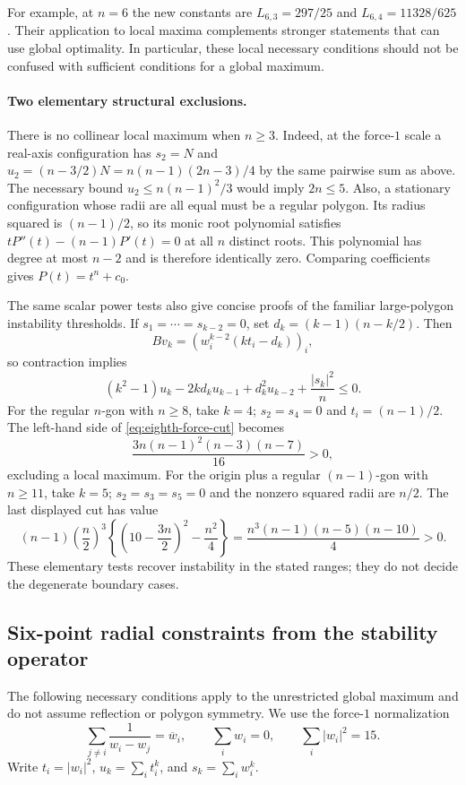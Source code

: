 \documentclass[11pt]{article}
\theoremstyle{remark}
\numberwithin{equation}{section}
\begin{document}
For example, at $n=6$ the new constants are
$L_{6,3}=297/25$ and $L_{6,4}=11328/625$.
Their application to local maxima complements stronger statements
that can use global optimality.  In particular, these local
necessary conditions should not be confused with sufficient
conditions for a global maximum.

\paragraph{Two elementary structural exclusions.}
There is no collinear local maximum when $n\ge3$.
Indeed, at the force-$1$ scale a real-axis configuration has
$s_2=N$ and
$u_2=(n-3/2)N=n(n-1)(2n-3)/4$ by the same pairwise sum as above.
The necessary bound $u_2\le n(n-1)^2/3$ would imply $2n\le5$.
Also, a stationary configuration whose radii are all equal must
be a regular polygon.  Its radius squared is $(n-1)/2$, so its
monic root polynomial satisfies
$tP''(t)-(n-1)P'(t)=0$ at all $n$ distinct roots.  This polynomial
has degree at most $n-2$ and is therefore identically zero.
Comparing coefficients gives $P(t)=t^n+c_0$.

The same scalar power tests also give concise proofs of the familiar
large-polygon instability thresholds.  If
$s_1=\cdots=s_{k-2}=0$, set
$d_k=(k-1)(n-k/2)$.  Then
\[
 Bv_k=(w_i^{k-2}(kt_i-d_k))_i,
\]
so contraction implies
\[
 (k^2-1)u_k-2kd_ku_{k-1}+d_k^2u_{k-2}
       +\frac{|s_k|^2}{n}\le0.
\]
For the regular $n$-gon with $n\ge8$, take $k=4$;
$s_2=s_4=0$ and $t_i=(n-1)/2$.  The left-hand side of
\eqref{eq:eighth-force-cut} becomes
\[
 \frac{3n(n-1)^2(n-3)(n-7)}{16}>0,
\]
excluding a local maximum.  For the origin plus a regular
$(n-1)$-gon with $n\ge11$, take $k=5$;
$s_2=s_3=s_5=0$ and the nonzero squared radii are $n/2$.
The last displayed cut has value
\[
 (n-1)\left(\frac n2\right)^3
       \left\{\left(10-\frac{3n}{2}\right)^2-\frac{n^2}{4}\right\}
 =\frac{n^3(n-1)(n-5)(n-10)}4>0.
\]
These elementary tests recover instability in the stated ranges;
they do not decide the degenerate boundary cases.

\subsection{Six-point radial constraints from the stability operator}

The following necessary conditions apply to the unrestricted global
maximum and do not assume reflection or polygon symmetry.  We use the
force-$1$ normalization
\[
 \sum_{j\ne i}\frac1{w_i-w_j}=\overline w_i,
 \qquad\sum_iw_i=0,\qquad\sum_i|w_i|^2=15.
\]
Write $t_i=|w_i|^2$, $u_k=\sum_i t_i^k$, and
$s_k=\sum_iw_i^k$.
\end{document}
